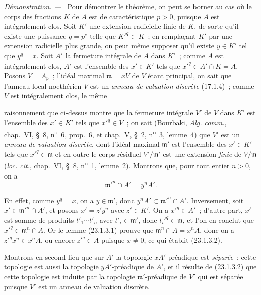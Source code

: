 \documentclass[10pt,oneside]{book}
\newcommand{\oldpage}[2][]{%
  \setcounter{footnote}{0}%
  \marginpar{\scriptsize\textbf{#1}~|~#2}\ignorespaces}
\newenvironment{proof}{%
  \par\medskip\noindent\textit{Démonstration. ---\ }}{\par}
\begin{document}
\begin{proof}
Pour démontrer le théorème, on peut se borner au cas où le corps des fractions
$K$ de $A$ est de caractéristique $p>0$, puisque $A$ est intégralement clos.
Soit $K'$ une extension radicielle finie de $K$, de sorte qu'il existe une
puissance $q=p^e$ telle que $K'^q\subset K$~; en remplaçant $K'$ par une
extension radicielle plus grande, on peut même supposer qu'il existe $y\in K'$
tel que $y^q=x$. Soit $A'$ la fermeture intégrale de $A$ dans $K'$~; comme
$A$ est intégralement clos, $A'$ est l'ensemble des $x'\in K'$ tels que
$x'^q\in A'\cap K=A$. Posons $V=A_{\mathfrak p}$~; l'idéal maximal
$\mathfrak m=xV$ de $V$ étant principal, on sait que l'anneau local
noethérien $V$ est un \emph{anneau de valuation discrète} (17.1.4)~; comme
$V$ est intégralement clos, le même

\oldpage[0\textsubscript{IV-1}]{215}

raisonnement que ci-dessus montre que la fermeture intégrale $V'$ de $V$ dans
$K'$ est l'ensemble des $x'\in K'$ tels que $x'^q\in V$~; on sait
(Bourbaki, \emph{Alg. comm.}, chap.~VI, §~8, n\textsuperscript{o}~6,
prop.~6, et chap.~V, §~2, n\textsuperscript{o}~3, lemme~4) que $V'$ est un
\emph{anneau de valuation discrète}, dont l'idéal maximal $\mathfrak m'$ est
l'ensemble des $x'\in K'$ tels que $x'^q\in\mathfrak m$ et en outre le corps
résiduel $V'/\mathfrak m'$ est une extension \emph{finie} de
$V/\mathfrak m$ (\emph{loc. cit.}, chap.~VI, §~8,
n\textsuperscript{o}~1, lemme~2). Montrons que, pour tout entier $n>0$, on a
\begin{equation}
\label{0.23.1.3.2-fr}
  \mathfrak m'^n\cap A'=y^nA'.
  \tag{23.1.3.2}
\end{equation}

En effet, comme $y^q=x$, on a $y\in\mathfrak m'$, donc
$y^nA'\subset\mathfrak m'^n\cap A'$. Inversement, soit
$x'\in\mathfrak m'^n\cap A'$, et posons $x'=z'y^n$ avec $z'\in K'$. On a
$x'^q\in A'$~; d'autre part, $x'$ est somme de produits
$t'_1\cdots t'_n$ avec $t'_i\in\mathfrak m'$, donc
$t_i'^q\in\mathfrak m$, et l'on en conclut que
$x'^q\in\mathfrak m^n\cap A$. Or le lemme (23.1.3.1) prouve que
$\mathfrak m^n\cap A=x^nA$, donc on a $z'^qx^n\in x^nA$, ou encore
$z'^q\in A$ puisque $x\neq0$, ce qui établit (23.1.3.2).

Montrons en second lieu que sur $A'$ la topologie $xA'$-préadique est
\emph{séparée}~; cette topologie est aussi la topologie $yA'$-préadique de
$A'$, et il résulte de (23.1.3.2) que cette topologie est induite par la
topologie $\mathfrak m'$-préadique de $V'$ qui est séparée puisque $V'$ est
un anneau de valuation discrète.


\end{proof}
\end{document}
